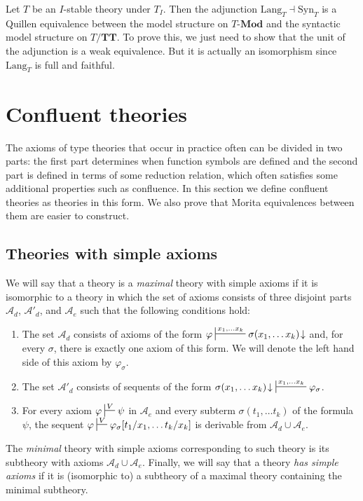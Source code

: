\documentclass[reqno]{amsart}
\theoremstyle{definition}
\theoremstyle{remark}
\newcommand{\cat}[1]{\mathbf{#1}}
\newcommand{\Mod}[1]{#1\text{-}\cat{Mod}}
\newcommand{\algtt}{\cat{TT}}
\newcommand{\Syn}{\mathrm{Syn}}
\newcommand{\Lang}{\mathrm{Lang}}
\numberwithin{figure}{section}
\begin{document}
Let $T$ be an $I$-stable theory under $T_I$.
Then the adjunction $\Lang_T \dashv \Syn_T$ is a Quillen equivalence between the model structure on $\Mod{T}$ and the syntactic model structure on $T/\algtt$.
To prove this, we just need to show that the unit of the adjunction is a weak equivalence.
But it is actually an isomorphism since $\Lang_T$ is full and faithful.

\section{Confluent theories}

The axioms of type theories that occur in practice often can be divided in two parts: the first part determines when function symbols are defined and the second part is defined in terms of some reduction relation,
which often satisfies some additional properties such as confluence.
In this section we define confluent theories as theories in this form.
We also prove that Morita equivalences between them are easier to construct.

\subsection{Theories with simple axioms}

We will say that a theory is a \emph{maximal} theory with simple axioms if it is isomorphic to a theory in which the set of axioms consists of three disjoint parts $\mathcal{A}_d$, $\mathcal{A}'_d$, and $\mathcal{A}_e$ such that the following conditions hold:
\begin{enumerate}
\item The set $\mathcal{A}_d$ consists of axioms of the form $\varphi \sststile{}{x_1, \ldots x_k} \sigma(x_1, \ldots x_k)\!\downarrow$ and, for every $\sigma$, there is exactly one axiom of this form.
We will denote the left hand side of this axiom by $\varphi_\sigma$.
\item The set $\mathcal{A}'_d$ consists of sequents of the form $\sigma(x_1, \ldots x_k)\!\downarrow\ \sststile{}{x_1, \ldots x_k} \varphi_\sigma$.
\item For every axiom $\varphi \sststile{}{V} \psi$ in $\mathcal{A}_e$ and every subterm $\sigma(t_1, \ldots t_k)$ of the formula $\psi$,
the sequent $\varphi \sststile{}{V} \varphi_\sigma[t_1/x_1, \ldots t_k/x_k]$ is derivable from $\mathcal{A}_d \cup \mathcal{A}_e$.
\end{enumerate}
The \emph{minimal} theory with simple axioms corresponding to such theory is its subtheory with axioms $\mathcal{A}_d \cup \mathcal{A}_e$.
Finally, we will say that a theory \emph{has simple axioms} if it is (isomorphic to) a subtheory of a maximal theory containing the minimal subtheory.
\end{document}
